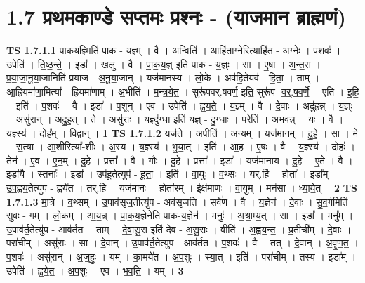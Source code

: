 \documentclass[17pt]{extarticle}
\begin{document}
\section*{ 1.7     प्रथमकाण्डे सप्तमः प्रश्नः - (याजमान ब्राह्मणं) }
                                \textbf{ TS 1.7.1.1} \newline
                  पा॒क॒य॒ज्ञ्मिति॑ पाक - य॒ज्ञ्म् । वै । अन्विति॑ । आहि॑ताग्ने॒रित्याहि॑त - अ॒ग्नेः॒ । प॒शवः॑ । उपेति॑ । ति॒ष्ठ॒न्ते॒ । इडा᳚ । खलु॑ । वै । पा॒क॒य॒ज्ञ् इति॑ पाक - य॒ज्ञ्ः । सा । ए॒षा । अ॒न्त॒रा । प्र॒या॒जा॒नू॒या॒जानिति॑ प्रयाज - अ॒नू॒या॒जान् । यज॑मानस्य । लो॒के । अव॑हि॒तेयव॑ - हि॒ता॒ । ताम् । आ॒ह्रि॒यमा॑णा॒मित्या᳚ - ह्रि॒यमा॑णाम् । अ॒भीति॑ । म॒न्त्र॒ये॒त॒ । सुरू॑पवर्.षवर्ण॒ इति॒ सुरू॑प -व॒र्॒.ष॒व॒र्णे॒ । एति॑ । इ॒हि॒ । इति॑ । प॒शवः॑ । वै । इडा᳚ । प॒शून् । ए॒व । उपेति॑ । ह्व॒य॒ते॒ । य॒ज्ञ्म् । वै । दे॒वाः । अदु॑ह्रन्न् । य॒ज्ञ्ः । असु॑रान् । अ॒दु॒ह॒त् । ते । असु॑राः । य॒ज्ञ्दु॑ग्धा॒ इति॑ य॒ज्ञ् - दु॒ग्धाः॒ । परेति॑ । अ॒भ॒व॒न्न् । यः । वै । य॒ज्ञ्स्य॑ । दोह᳚म् । वि॒द्वान् । \textbf{  1} \newline
                  \newline
                                \textbf{ TS 1.7.1.2} \newline
                  यज॑ते । अपीति॑ । अ॒न्यम् । यज॑मानम् । दु॒हे॒ । सा । मे॒ । स॒त्या । आ॒शीरित्या᳚-शीः । अ॒स्य । य॒ज्ञ्स्य॑ । भू॒या॒त् । इति॑ । आ॒ह॒ । ए॒षः । वै । य॒ज्ञ्स्य॑ । दोहः॑ । तेन॑ । ए॒व । ए॒न॒म् । दु॒हे॒ । प्रत्ता᳚ । वै । गौः । दु॒हे॒ । प्रत्ता᳚ । इडा᳚ । यज॑मानाय । दु॒हे॒ । ए॒ते । वै । इडा॑यै । स्तनाः᳚ । इडा᳚ । उप॑हू॒तेत्युप॑ - हू॒ता॒ । इति॑ । वा॒युः । व॒थ्सः । यर्.हि॑ । होता᳚ । इडा᳚म् । उ॒प॒ह्वय॒तेत्यु॑प - ह्वये॑त । तर्.हि॑ । यज॑मानः । होता॑रम् । ईक्ष॑माणः । वा॒युम् । मन॑सा । ध्या॒ये॒त् । \textbf{  2} \newline
                  \newline
                                \textbf{ TS 1.7.1.3} \newline
                  मा॒त्रे । व॒थ्सम् । उ॒पाव॑सृज॒तीत्यु॑प - अव॑सृजति । सर्वे॑ण । वै । य॒ज्ञेन॑ । दे॒वाः । सु॒व॒र्गमिति॑ सुवः - गम् । लो॒कम् । आ॒य॒न्न् । पा॒क॒य॒ज्ञेनेति॑ पाक-य॒ज्ञेन॑ । मनुः॑ । अ॒श्रा॒म्य॒त् । सा । इडा᳚ । मनु᳚म् । उ॒पाव॑र्त॒तेत्यु॑प - आव॑र्तत । ताम् । दे॒वा॒सु॒रा इति॑ देव - अ॒सु॒राः । वीति॑ । अ॒ह्व॒य॒न्त॒ । प्र॒तीची᳚म् । दे॒वाः । परा॑चीम् । असु॑राः । सा । दे॒वान् । उ॒पाव॑र्त॒तेत्यु॑प - आव॑र्तत । प॒शवः॑ । वै । तत् । दे॒वान् । अ॒वृ॒ण॒त॒ । प॒शवः॑ । असु॑रान् । अ॒ज॒हुः॒ । यम् । का॒मये॑त । अ॒प॒शुः । स्या॒त् । इति॑ । परा॑चीम् । तस्य॑ । इडा᳚म् । उपेति॑ । ह्व॒ये॒त॒ । अ॒प॒शुः । ए॒व । भ॒व॒ति॒ । यम् । \textbf{  3} \newline
\end{document}
